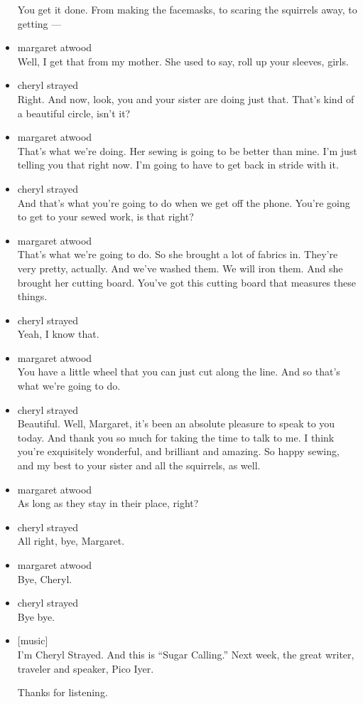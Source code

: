 \begin{itemize}
  You get it done. From making the facemasks, to scaring the squirrels
  away, to getting ---
\item
  margaret atwood\\
  Well, I get that from my mother. She used to say, roll up your
  sleeves, girls.
\item
  cheryl strayed\\
  Right. And now, look, you and your sister are doing just that. That's
  kind of a beautiful circle, isn't it?
\item
  margaret atwood\\
  That's what we're doing. Her sewing is going to be better than mine.
  I'm just telling you that right now. I'm going to have to get back in
  stride with it.
\item
  cheryl strayed\\
  And that's what you're going to do when we get off the phone. You're
  going to get to your sewed work, is that right?
\item
  margaret atwood\\
  That's what we're going to do. So she brought a lot of fabrics in.
  They're very pretty, actually. And we've washed them. We will iron
  them. And she brought her cutting board. You've got this cutting board
  that measures these things.
\item
  cheryl strayed\\
  Yeah, I know that.
\item
  margaret atwood\\
  You have a little wheel that you can just cut along the line. And so
  that's what we're going to do.
\item
  cheryl strayed\\
  Beautiful. Well, Margaret, it's been an absolute pleasure to speak to
  you today. And thank you so much for taking the time to talk to me. I
  think you're exquisitely wonderful, and brilliant and amazing. So
  happy sewing, and my best to your sister and all the squirrels, as
  well.
\item
  margaret atwood\\
  As long as they stay in their place, right?
\item
  cheryl strayed\\
  All right, bye, Margaret.
\item
  margaret atwood\\
  Bye, Cheryl.
\item
  cheryl strayed\\
  Bye bye.
\item
  {[}music{]}\\
  I'm Cheryl Strayed. And this is ``Sugar Calling.'' Next week, the
  great writer, traveler and speaker, Pico Iyer.

  Thanks for listening.
\end{itemize}

